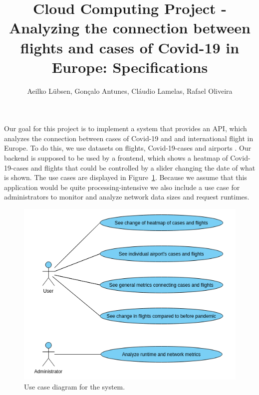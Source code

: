 \documentclass[12pt]{article}
\title{Cloud Computing Project - Analyzing the connection between flights and cases of Covid-19 in Europe: Specifications}
\author{Aeilko Lübsen, Gonçalo Antunes, Cláudio Lamelas, Rafael Oliveira}
\begin{document}
	\maketitle
	
	Our goal for this project is to implement a system that provides an API, which analyzes the connection between cases of Covid-19 and and international flight in Europe. To do this, we use datasets on flights, Covid-19-cases and airports \cite{airtraffic2021, covid2022, nuts2016, airports2022}. Our backend is supposed to be used by a frontend, which shows a heatmap of Covid-19-cases and flights that could be controlled by a slider changing the date of what is shown. The use cases are displayed in Figure~\ref{fig:use_cases}. Because we assume that this application would be quite processing-intensive we also include a use case for administrators to monitor and analyze network data sizes and request runtimes.
	
	\begin{figure}[h!]
		\centering
		\includegraphics[scale=0.6]{use_cases.png}
		\caption{Use case diagram for the system.}
		\label{fig:use_cases}
	\end{figure}
\end{document}
